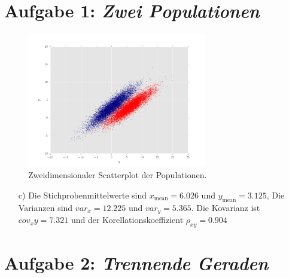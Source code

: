  

\section*{Aufgabe 1: \emph{Zwei Populationen}}


\begin{figure}
	\centering
	\includegraphics[width=0.7\textwidth]{1b.png}
	\caption{Zweidimensionaler Scatterplot der Populationen.}
\end{figure}
\begin{itemize}
\item[c)]
Die Stichprobenmittelwerte sind $x_{\text{mean}} = 6.026$ und $y_{\text{mean}} = 3.125$,
Die Varianzen sind $var_x = 12.225$ und $var_y = 5.365$.
Die Kovarianz ist $cov_xy = 7.321$ und der Korellationskoeffizient $\rho_{xy} = 0.904$
\end{itemize}


\section*{Aufgabe 2: \emph{Trennende Geraden}}

